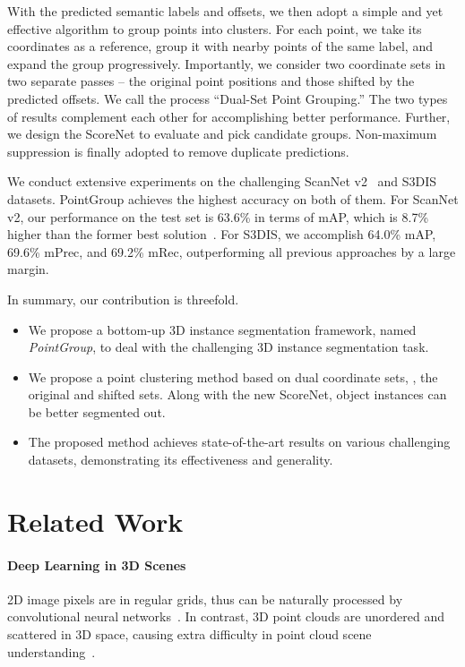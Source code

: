 \documentclass[10pt,twocolumn,letterpaper]{article}
\begin{document}
With the predicted semantic labels and offsets, we then adopt a simple and yet effective algorithm to group points into clusters.
For each point, we take its coordinates as a reference, group it with nearby points of the same label, and expand the group progressively.
Importantly, we consider two coordinate sets in two separate passes -- the original point positions and those shifted by the predicted offsets. We call the process ``Dual-Set Point Grouping.'' The two types of results complement each other for accomplishing better performance.
Further, we design the ScoreNet to evaluate and pick candidate groups. Non-maximum suppression is finally adopted to remove duplicate predictions.

We conduct extensive experiments on the challenging ScanNet v2~\cite{dai2017scannet} and S3DIS~\cite{armeni2016s3dis} datasets.
PointGroup achieves the highest accuracy on both of them.
For ScanNet v2, our performance on the test set is 63.6\% in terms of mAP, which is 8.7\% higher than the former best solution~\cite{lahoud20193d}.
For S3DIS, we accomplish 64.0\% mAP, 69.6\% mPrec, and 69.2\% mRec, outperforming all previous approaches by a large margin. 

In summary, our contribution is threefold.
\begin{itemize}
\vspace*{-0.8mm}
	\item We propose a bottom-up 3D instance segmentation framework, named {\em PointGroup\/}, to deal with the challenging 3D instance segmentation task.
\vspace*{-0.8mm}
	\item We propose a point clustering method based on dual coordinate sets, \ie, the original and shifted sets. Along with the new ScoreNet, object instances can be better segmented out.
\vspace*{-0.8mm}
	\item The proposed method achieves state-of-the-art results on various challenging datasets, demonstrating its effectiveness and generality.
\end{itemize}



\section{Related Work}
\paragraph{Deep Learning in 3D Scenes}
2D image pixels are in regular grids, thus can be naturally processed by convolutional neural networks~\cite{lecun1998gradient,krizhevsky2012imagenet,simonyan2014very,szegedy2015going,he2016deep}.
In contrast, 3D point clouds are unordered and scattered in 3D space, causing extra difficulty in point cloud scene understanding~\cite{qi2017pointnet2,shi2019pointrcnn}.
\end{document}
